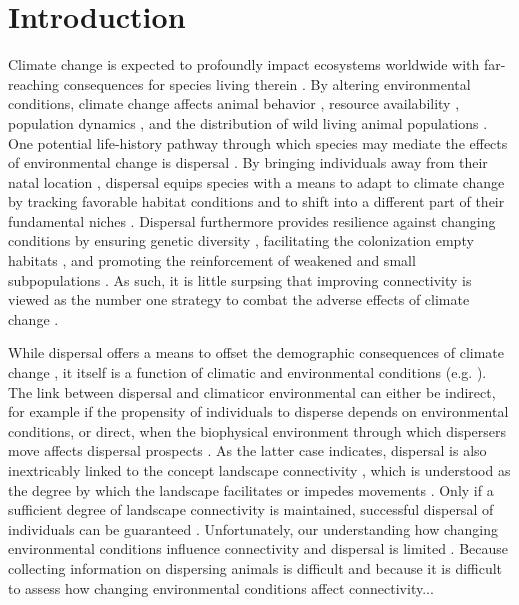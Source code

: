 \documentclass[abstract=on,10pt,a4paper,bibliography=totocnumbered]{article}
\begin{document}
\onehalfspacing
\tableofcontents
\doublespacing

\newpage
{}


\section{Introduction}
Climate change is expected to profoundly impact ecosystems worldwide with
far-reaching consequences for species living therein \citep{Ozgul.2010,
Radchuk.2019, IPCC.2022}. By altering environmental conditions, climate change
affects animal behavior \citep{Fuller.2016}, resource availability
\citep{Durant.2007}, population dynamics \citep{Paniw.2021}, and the
distribution of wild living animal populations \citep{Thomas.2004,
Thuiller.2006}. One potential life-history pathway through which species may
mediate the effects of environmental change is dispersal \citep{Anderson.2012}.
By bringing individuals away from their natal location \citep{Clobert.2012},
dispersal equips species with a means to adapt to climate change by tracking
favorable habitat conditions \citep{Raia.2012} and to shift into a different
part of their fundamental niches \citep{Kokko.2022}. Dispersal furthermore
provides resilience against changing conditions by ensuring genetic diversity
\citep{Frankham.2002, Leigh.2012, Baguette.2013}, facilitating the colonization
empty habitats \citep{Gustafson.1996, Hanski.1999b, MacArthur.2001}, and
promoting the reinforcement of weakened and small subpopulations
\citep{Brown.1977}. As such, it is little surpsing that improving connectivity
is viewed as the number one strategy to combat the adverse effects of climate
change \citep{Heller.2009}.

While dispersal offers a means to offset the demographic consequences of climate
change \citep{Kokko.2006, Hodgson.2009, Travis.2013}, it itself is a function of
climatic and environmental conditions (e.g. \citep{Behr.2020}). The link between
dispersal and climaticor environmental can either be indirect, for example if
the propensity of individuals to disperse depends on environmental conditions,
or direct, when the biophysical environment through which dispersers move
affects dispersal prospects \citep{Travis.2013}. As the latter case indicates,
dispersal is also inextricably linked to the concept landscape connectivity
\citep{Baguette.2013}, which is understood as the degree by which the landscape
facilitates or impedes movements \citep{Taylor.1993}. Only if a sufficient
degree of landscape connectivity is maintained, successful dispersal of
individuals can be guaranteed \citep{Fahrig.2003}. Unfortunately, our
understanding how changing environmental conditions influence connectivity and
dispersal is limited \citep{Kokko.2006, Travis.2013}. Because collecting
information on dispersing animals is difficult and because it is difficult to
assess how changing environmental conditions affect connectivity...
\end{document}
